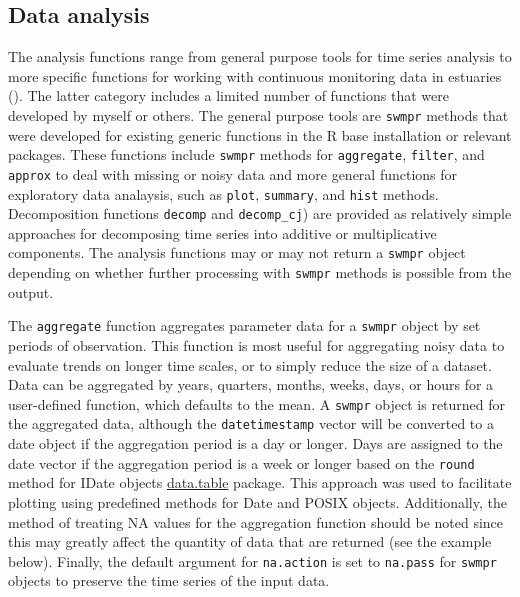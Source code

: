 \documentclass[10pt,letterpaper]{article}\usepackage[]{graphicx}\usepackage[]{color}
\begin{document}
\subsection*{Data analysis}

The analysis functions range from general purpose tools for time series analysis to more specific functions for working with continuous monitoring data in estuaries ().  The latter category includes a limited number of functions that were developed by myself or others.  The general purpose tools are \texttt{swmpr} methods that were developed for existing generic functions in the R base installation or relevant packages.  These functions include \texttt{swmpr} methods for \texttt{aggregate}, \texttt{filter}, and \texttt{approx} to deal with missing or noisy data and more general functions for exploratory data analaysis, such as \texttt{plot}, \texttt{summary}, and \texttt{hist} methods.  Decomposition functions \texttt{decomp} and \texttt{decomp\_cj}) are provided as relatively simple approaches for decomposing time series into additive or multiplicative components. The analysis functions may or may not return a \texttt{swmpr} object depending on whether further processing with \texttt{swmpr} methods is possible from the output.    

The \texttt{aggregate} function aggregates parameter data for a \texttt{swmpr} object by set periods of observation.  This function is most useful for aggregating noisy data to evaluate trends on longer time scales, or to simply reduce the size of a dataset.  Data can be aggregated by years, quarters, months, weeks, days, or hours for a user-defined function, which defaults to the mean.  A \texttt{swmpr} object is returned for the aggregated data, although the \texttt{datetimestamp} vector will be converted to a date object if the aggregation period is a day or longer.  Days are assigned to the date vector if the aggregation period is a week or longer based on the \texttt{round} method for IDate objects \href{http://cran.r-project.org/web/packages/data.table/index.html}{data.table} package.  This approach was used to facilitate plotting using predefined methods for Date and POSIX objects.  Additionally, the method of treating NA values for the aggregation function should be noted since this may greatly affect the quantity of data that are returned (see the example below).  Finally, the default argument for \texttt{na.action} is set to \texttt{na.pass} for \texttt{swmpr} objects to preserve the time series of the input data.
\end{document}
